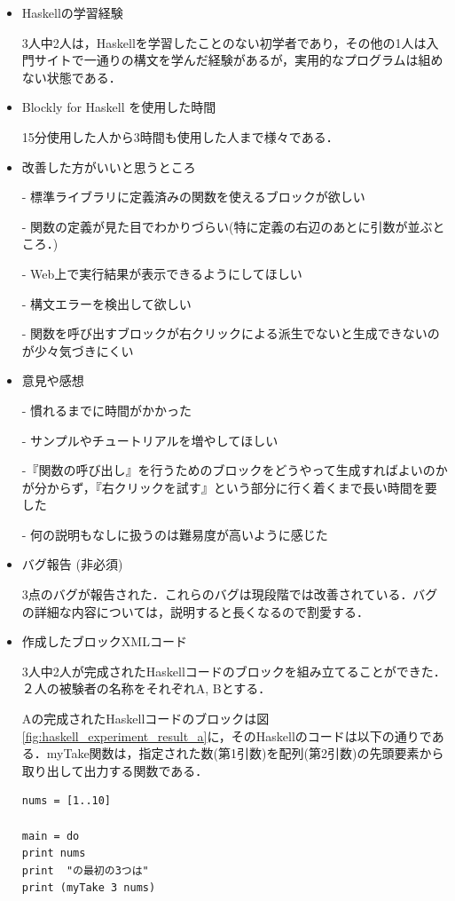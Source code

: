 \documentclass{risepaper}
\begin{document}
\begin{itemize}
\item Haskellの学習経験

3人中2人は，Haskellを学習したことのない初学者であり，その他の1人は入門サイトで一通りの構文を学んだ経験があるが，実用的なプログラムは組めない状態である．

\item Blockly for Haskell を使用した時間

15分使用した人から3時間も使用した人まで様々である．

\item 改善した方がいいと思うところ

- 標準ライブラリに定義済みの関数を使えるブロックが欲しい

- 関数の定義が見た目でわかりづらい(特に定義の右辺のあとに引数が並ぶところ．)

- Web上で実行結果が表示できるようにしてほしい

- 構文エラーを検出して欲しい

- 関数を呼び出すブロックが右クリックによる派生でないと生成できないのが少々気づきにくい

\item 意見や感想

- 慣れるまでに時間がかかった

- サンプルやチュートリアルを増やしてほしい

-『関数の呼び出し』を行うためのブロックをどうやって生成すればよいのかが分からず，『右クリックを試す』という部分に行く着くまで長い時間を要した

- 何の説明もなしに扱うのは難易度が高いように感じた

\item バグ報告 (非必須)

3点のバグが報告された．これらのバグは現段階では改善されている．バグの詳細な内容については，説明すると長くなるので割愛する．
\item 作成したブロックXMLコード

3人中2人が完成されたHaskellコードのブロックを組み立てることができた．２人の被験者の名称をそれぞれA, Bとする．

Aの完成されたHaskellコードのブロックは図\ref{fig:haskell_experiment_result_a}に，そのHaskellのコードは以下の通りである．myTake関数は，指定された数(第1引数)を配列(第2引数)の先頭要素から取り出して出力する関数である．
\begin{lstlisting}[basicstyle=\ttfamily\footnotesize]
nums = [1..10]

main = do
print nums
print  "の最初の3つは"
print (myTake 3 nums)


\end{lstlisting}
\end{itemize}
\end{document}
